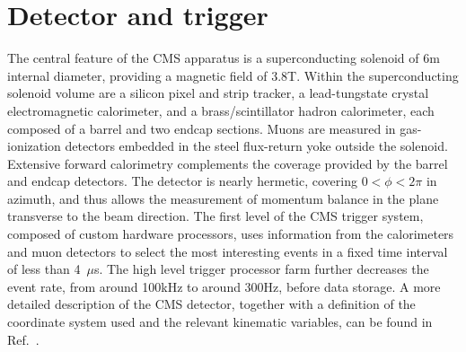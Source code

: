 \section{Detector and trigger}
\label{sec:CMS}

The central feature of the CMS apparatus is a superconducting solenoid of 
6\unit{m} internal diameter, providing a magnetic field of 3.8\unit{T}. 
Within the superconducting solenoid volume are a silicon pixel and strip tracker, 
a lead-tungstate crystal electromagnetic calorimeter, and a brass{\slash}scintillator 
hadron calorimeter, each composed of a barrel and two endcap sections. 
Muons are measured in gas-ionization detectors embedded in the steel flux-return 
yoke outside the solenoid. Extensive forward calorimetry complements the coverage 
provided by the barrel and endcap detectors. 
%
%
The detector is nearly hermetic, covering $0<\phi<2\pi$ in azimuth, and thus allows
the measurement of momentum balance in the plane transverse to the beam
direction.
%
The first level of the CMS trigger system, composed of custom hardware
processors, uses information from the calorimeters and muon detectors to
select the most interesting events in a fixed time interval of less than
4~$\mu$s. The high level trigger processor farm further decreases the event
rate, from around 100\unit{kHz} to around 300\unit{Hz}, before data storage.
%
A more detailed description of the CMS detector, together with a definition of the 
coordinate system used and the relevant kinematic variables, 
can be found in Ref.~\cite{Chatrchyan:2008aa}. 


